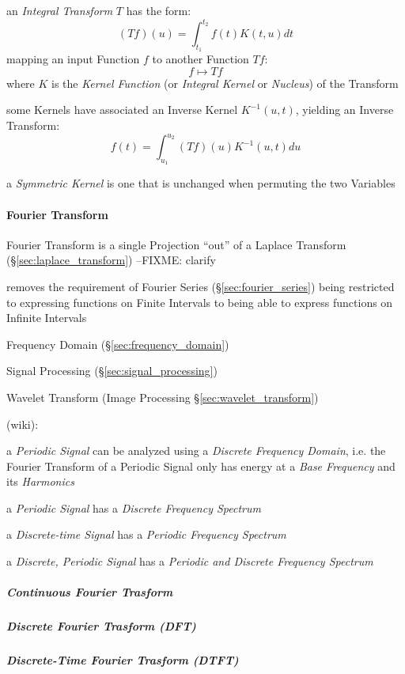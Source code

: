 an \emph{Integral Transform} $T$ has the form:
\[
  (T f)(u) = \int_{t_1}^{t_2} f(t) K(t,u) dt
\]
mapping an input Function $f$ to another Function $T f$:
\[
  f \mapsto T f
\]
where $K$ is the \emph{Kernel Function} (or \emph{Integral Kernel} or
\emph{Nucleus}) of the Transform

some Kernels have associated an Inverse Kernel $K^{-1}(u,t)$, yielding an
Inverse Transform:
\[
  f(t) = \int_{u_1}^{u_2} (T f)(u) K^{-1}(u,t) du
\]

a \emph{Symmetric Kernel} is one that is unchanged when permuting the two
Variables



\paragraph{Fourier Transform}\label{sec:fourier_transform}\hfill

Fourier Transform is a single Projection ``out'' of a Laplace Transform
(\S\ref{sec:laplace_transform}) --FIXME: clarify

removes the requirement of Fourier Series (\S\ref{sec:fourier_series}) being
restricted to expressing functions on Finite Intervals to being able to express
functions on Infinite Intervals

\fist Frequency Domain (\S\ref{sec:frequency_domain})

\fist Signal Processing (\S\ref{sec:signal_processing})

\fist Wavelet Transform (Image Processing \S\ref{sec:wavelet_transform})

(wiki):

a \emph{Periodic Signal} can be analyzed using a \emph{Discrete Frequency
  Domain}, i.e. the Fourier Transform of a Periodic Signal only has energy at a
\emph{Base Frequency} and its \emph{Harmonics}

a \emph{Periodic Signal} has a \emph{Discrete Frequency Spectrum}

a \emph{Discrete-time Signal} has a \emph{Periodic Frequency Spectrum}

a \emph{Discrete, Periodic Signal} has a \emph{Periodic and Discrete Frequency
  Spectrum}



\subparagraph{Continuous Fourier Trasform}
\label{sec:continuous_fourier_transform}\hfill

\subparagraph{Discrete Fourier Trasform (DFT)}\label{sec:dft}\hfill

\subparagraph{Discrete-Time Fourier Trasform (DTFT)}\label{sec:dtft}\hfill



